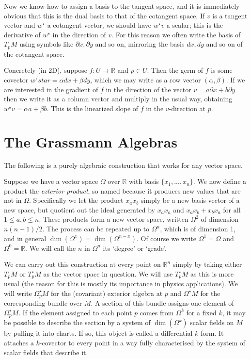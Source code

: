\documentclass[oneside,english]{amsbook}
\numberwithin{section}{chapter}
\theoremstyle{plain}
\theoremstyle{definition}
\begin{document}
Now we know how to assign a basis to the tangent space, and it is immediately obvious that this is the dual basis to that of the cotangent space. If $v$ is a tangent vector and $w^\star$ a cotangent vector, we should have $w^\star v$ a scalar; this is the derivative of $w^\star$ in the direction of $v$. For this reason we often write the basis of $T_p M$ using symbols like $\partial x, \partial y$ and so on, mirroring the basis $dx, dy$ and so on of the cotangent space.

Concretely (in 2D), suppose $f:U\to\mathbb{R}$ and $p\in U$. Then the germ of $f$ is some covector $w^/star = \alpha dx + \beta dy$, which we may write as a row vector $(\alpha, \beta)$. If we are interested in the gradient of $f$ in the direction of the vector $v = a\partial x + b\partial y$ then we write it as a column vector and multiply in the usual way, obtaining $w^\star v = \alpha a + \beta b$. This is the linearized slope of $f$ in the $v$-direction at $p$.

\section{The Grassmann Algebras}

The following is a purely algebraic construction that works for any vector space. 

Suppose we have a vector space $\Omega$ over $\mathbb{R}$ with basis $\{x_1,...,x_n\}$. We now define a product the \emph{exterior product}, so named because it produces new values that are not in $\Omega$. Specifically we let the product $x_a x_b$ simply be a new basis vector of a new space, but quotient out the ideal generated by $x_ax_a$ and $x_ax_b + x_bx_a$ for all $1\le a, b\le n$. These products form a new vector space, written $\Omega^2$ of dimension $n(n-1)/2$. The process can be repeated up to $\Omega^n$, which is of dimension 1, and in general $\dim(\Omega^x) = \dim(\Omega^{n - x})$. Of course we write $\Omega^1 = \Omega$ and $\Omega^0 = \mathbb{R}$. We will call the $n$ in $\Omega^n$ its `degree' or `grade'.

We can carry out this construction at every point on $\mathbb{R}^n$ simply by taking either $T_p M$ or $T_p^\star M$ as the vector space in question. We will use $T_p^\star M$ as this is more usual (the reason for this is mostly its importance in physics applications). We will write $\Omega^\star_p M$ for the (covariant) exterior algebra at $p$ and $\Omega^\star M$ for the corresponding bundle over $M$. A section of this bundle assigns one element of  $\Omega^\star_p M$. If the element assigned to each point $p$ comes from $\Omega^k$ for a fixed $k$, it may be possible to describe the section by a system of $\dim(\Omega^k)$ scalar fields on $M$ by pulling it into charts. If so, this object is called a differential $k$-form. It attaches a $k$-covector to every point in a way fully characterised by the system of scalar fields that describe it.
\end{document}
